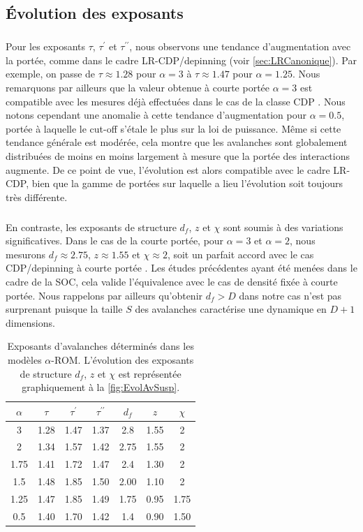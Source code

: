 \subsection{Évolution des exposants}

\subparagraph{}Pour les exposants $\tau$, $\tau^\prime$ et $\tau^{\prime\prime}$, nous observons une tendance d'augmentation avec la portée, comme dans le cadre LR-CDP/depinning (voir \autoref{sec:LRCanonique}). Par exemple, on passe de $\tau\approx 1.28$ pour $\alpha=3$ à $\tau\approx 1.47$ pour $\alpha=1.25$. Nous remarquons par ailleurs que la valeur obtenue à courte portée $\alpha = 3$ est compatible avec les mesures déjà effectuées dans le cas de la classe CDP  \cite{chessa_critical_1999}. Nous notons cependant une anomalie à cette tendance d'augmentation pour $\alpha=0.5$, portée à laquelle le cut-off s'étale le plus sur la loi de puissance. Même si cette tendance générale est modérée, cela montre que les avalanches sont globalement distribuées de moins en moins largement à mesure que la portée des interactions augmente. De ce point de vue, l'évolution est alors compatible avec le cadre LR-CDP, bien que la gamme de portées sur laquelle a lieu l'évolution soit toujours très différente.

\subparagraph{}En contraste, les exposants de structure $d_f$, $z$ et $\chi$ sont soumis à des variations significatives. Dans le cas de la courte portée, pour $\alpha=3$ et $\alpha=2$, nous mesurons $d_f \approx 2.75$, $z\approx 1.55$ et $\chi\approx 2$, soit un parfait accord avec le cas CDP/depinning à courte portée \cite{chessa_universality_1999, lubeck_universal_2004, chessa_critical_1999, wiese_theory_2022, rosso_depinning_2003}. Les études précédentes ayant été menées dans le cadre de la SOC, cela valide l'équivalence avec le cas de densité fixée à courte portée. Nous rappelons par ailleurs qu'obtenir $d_f>D$ dans notre cas n'est pas surprenant puisque la taille $S$ des avalanches caractérise une dynamique en $D+1$ dimensions. 

\begin{table}[h]
\centering
\begin{tabular}{ccccccc}
\hline \hline $\alpha$ & $\tau$ & \multicolumn{1}{c}{$\tau^\prime$} & $\tau^{\prime\prime}$ & $d_f$ & $z$ & $\chi$ \\
\hline 3 & 1.28 & 1.47 & 1.37 & 2.8 & 1.55 & 2 \\
2 & 1.34 & 1.57 & 1.42 & 2.75 & 1.55 & 2 \\
1.75 & 1.41 & 1.72 & 1.47 & 2.4 & 1.30 & 2 \\
1.5 & 1.48 & 1.85 & 1.50 & 2.00 & 1.10 & 2 \\
1.25 & 1.47 & 1.85 & 1.49 & 1.75 & 0.95 & 1.75 \\
0.5 & 1.40 & 1.70 & 1.42 & 1.4 & 0.90 & 1.50\\
\hline \hline
\end{tabular}
\caption{Exposants d'avalanches déterminés dans les modèles $\alpha$-ROM. L'évolution des exposants de structure $d_f$, $z$ et $\chi$ est représentée graphiquement à la \autoref{fig:EvolAvSusp}.}
\label{tab:expocritavsusp}
\end{table}

